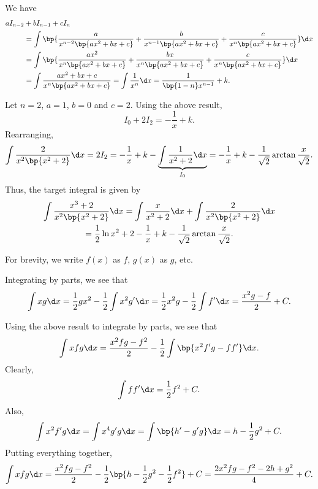 \begin{solution}
    \begin{ppart}
        We have
        \begin{align*}
            aI_{n-2} &+ bI_{n-1} + cI_n\\
            &= \int \bp{\frac{a}{x^{n-2} \bp{ax^2 + bx + c}} + \frac{b}{x^{n-1} \bp{ax^2 + bx + c}} + \frac{c}{x^{n} \bp{ax^2 + bx + c}}} \d x \\
            &= \int \bp{\frac{a x^2 }{x^{n} \bp{ax^2 + bx + c}} + \frac{b x}{x^{n} \bp{ax^2 + bx + c}} + \frac{c}{x^{n} \bp{ax^2 + bx + c}}} \d x\\
            &= \int \frac{a x^2 + bx + c }{x^{n} \bp{ax^2 + bx + c}} = \int \frac1{x^n} \d x = \frac1{\bp{1 - n} x^{n-1}} + k.
        \end{align*}
    \end{ppart}
    \begin{ppart}
        Let $n = 2$, $a = 1$, $b = 0$ and $c = 2$. Using the above result, \[I_{0} + 2I_2 = -\frac{1}{x} + k.\] Rearranging, \[\int \frac2{x^2 \bp{x^2 + 2}} \d x = 2I_2 = -\frac{1}{x} + k - \underbrace{\int \frac{1}{x^2 + 2} \d x}_{I_0} = -\frac1{x} + k - \frac1{\sqrt2} \arctan \frac{x}{\sqrt2}.\] Thus, the target integral is given by
        \begin{gather*}
            \int \frac{x^3 + 2}{x^2 \bp{x^2 + 2}} \d x = \int \frac{x}{x^2 + 2} \d x + \int \frac2{x^2 \bp{x^2 + 2}} \d x\\
            = \frac12 \ln{x^2 + 2} - \frac1{x} + k - \frac1{\sqrt2} \arctan \frac{x}{\sqrt2}.
        \end{gather*}
    \end{ppart}
    \begin{ppart}
        For brevity, we write $f(x)$ as $f$, $g(x)$ as $g$, etc.
        \begin{psubpart}
            Integrating by parts, we see that \[\int x g \d x = \frac12 g x^2 - \frac12 \int x^2 g' \d x = \frac12 x^2 g - \frac12 \int f' \d x = \frac{x^2 g - f}2 + C.\]
        \end{psubpart}
        \begin{psubpart}
            Using the above result to integrate by parts, we see that \[\int xfg \d x = \frac{x^2 fg - f^2}{2} - \frac12 \int \bp{x^2 f' g - f f'} \d x.\] Clearly, \[\int f f' \d x = \frac12 f^2 + C.\] Also, \[\int x^2 f' g \d x = \int x^4 g' g \d x = \int \bp{h' - g' g} \d x = h - \frac12 g^2 + C.\] Putting everything together, \[\int xfg \d x = \frac{x^2 fg - f^2}{2} - \frac12 \bp{h - \frac12 g^2 - \frac12 f^2} + C = \frac{2x^2 fg - f^2 - 2h + g^2}{4} + C.\]
        \end{psubpart}
    \end{ppart}
\end{solution}

